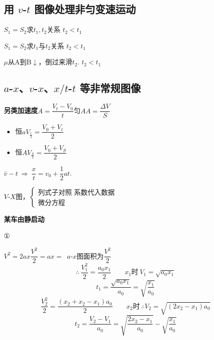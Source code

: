\subsection{用 $v$-$t$ 图像处理非匀变速运动}
$S_1=S_2$\quad 求$t_1,t_2$关系
$t_2<t_1$

$S_1=S_2$\quad 求$t_1$与$t_2$关系
$t_2<t_1$

$\mu$从A到B$\downarrow$，倒过来滑$t_2$.
$t_2<t_1$

\subsection{$a$-$x$、$v$-$x$、$x/t$-$t$ 等非常规图像}
\textbf{另类加速度}\quad $A=\dfrac{V_t-V_0}{t}$\quad 匀$A$\quad\quad $A=\dfrac{\Delta V}{S}$
\begin{itemize}
\item 恒$a$\quad $V_{\frac t2}=\dfrac{V_0+V_t}{2}$
\item 恒$A$\quad $V_{\frac S2}=\dfrac{V_0+V_S}{2}$
\end{itemize}

$\bar v-t\ \Rightarrow\ \dfrac{x}{t}=v_0+\dfrac{1}{2}at$.

$V$-$X$图，\quad $\left\{\begin{array}{l}\text{列式子对照\ 系数代入数据}\\ \text{微分方程}\end{array}\right.$

\textbf{某车由静启动}

①

$V^2=2ax$\quad $\dfrac{V^2}{2}=ax=$\ $a$-$x$图面积为$\dfrac{V^2}{2}$
\[ \therefore\ \frac{V_1^2}{2}=\frac{a_0x_1}{2}\qquad x_1\text{时}\ V_1=\sqrt{a_0x_1}\]
\[ t_1=\frac{\sqrt{a_0x_1}}{a_0}=\sqrt{\frac{x_1}{a_0}} \]
\[ \frac{V_2^2}{2}=\frac{(x_2+x_2-x_1)a_0}{2}\qquad x_2\text{时}\ \therefore V_2=\sqrt{(2x_2-x_1)a_0}\]
\[ t_2=\frac{V_2-V_1}{a_0}=\sqrt{\frac{2x_2-x_1}{a_0}}-\sqrt{\frac{x_1}{a_0}} \]


